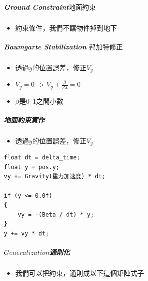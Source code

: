 \subparagraph{Ground Constraint\(地面約束\)}
\begin{itemize}
    \item{約束條件，我們不讓物件掉到地下}
\end{itemize}

\subparagraph{Baumgarte Stabilization \(邦加特修正\)}

\begin{itemize}
    \item{透過$y$的位置誤差，修正$V_y$}
    \item{$V_y = 0$ -> $V_y + \frac{\beta}{\Delta t} = 0$}
    \item{$\beta$是0~1之間小數}
\end{itemize}

\subparagraph{地面約束實作}

\begin{itemize}
    \item{透過$y$的位置誤差，修正$V_y$}
\end{itemize}

\begin{lstlisting}
float dt = delta_time;
float y = pos.y;
vy += Gravity(重力加速度) * dt;

if (y <= 0.0f)
{
    vy = -(Beta / dt) * y;
}
y += vy * dt;
\end{lstlisting}


\subparagraph{\(Generalization\)通則化}

\begin{itemize}
    \item{我們可以把約束，通則成以下這個矩陣式子}
\end{itemize}

